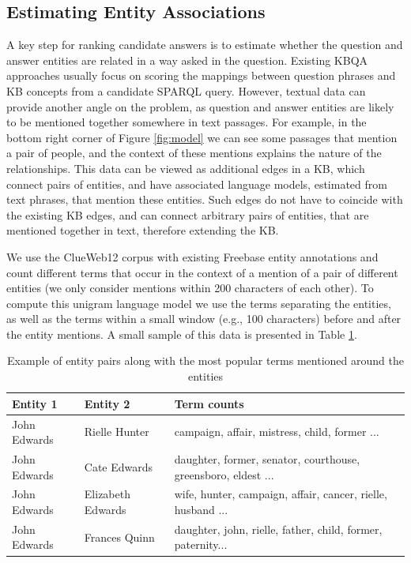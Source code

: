 \subsection{Estimating Entity Associations}
\label{section:method:clueweb}

A key step for ranking candidate answers is to estimate whether the question and answer entities are related in a way asked in the question.
Existing KBQA approaches usually focus on scoring the mappings between question phrases and KB concepts from a candidate SPARQL query.
However, textual data can provide another angle on the problem, as question and answer entities are likely to be mentioned together somewhere in text passages.
For example, in the bottom right corner of Figure \ref{fig:model} we can see some passages that mention a pair of people, and the context of these mentions explains the nature of the relationships.
This data can be viewed as additional edges in a KB, which connect pairs of entities, and have associated language models, estimated from text phrases, that mention these entities.
Such edges do not have to coincide with the existing KB edges, and can connect arbitrary pairs of entities, that are mentioned together in text, therefore extending the KB.

We use the ClueWeb12 corpus with existing Freebase entity annotations and count different terms that occur in the context of a mention of a pair of different entities (we only consider mentions within 200 characters of each other).
To compute this unigram language model we use the terms separating the entities, as well as the terms within a small window (e.g., 100 characters) before and after the entity mentions.
A small sample of this data is presented in Table \ref{table:clueweb_entitypairs_langmodel}.

\begin{table}
\begin{tabular}{| p{1.25cm} | p{1.23cm} | p{4.5cm} |}
\hline
Entity 1 & Entity 2 & Term counts\\
\hline
John Edwards & Rielle Hunter & campaign, affair, mistress, child, former ...\\
\hline
John Edwards & Cate Edwards & daughter, former, senator, courthouse, greensboro, eldest ...\\
\hline
John Edwards & Elizabeth Edwards & wife, hunter, campaign, affair, cancer, rielle, husband ...\\
\hline
John Edwards & Frances Quinn & daughter, john, rielle, father, child, former, paternity...\\
\hline
\end{tabular}
\vspace{-2mm}
\caption{Example of entity pairs along with the most popular terms mentioned around the entities}
\label{table:clueweb_entitypairs_langmodel}
\vspace{-2mm}
\end{table}

